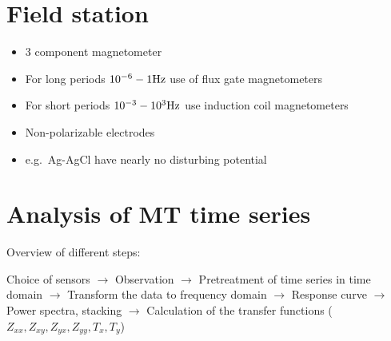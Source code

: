 \setcounter{section}{1}\addtocounter{section}{-1}\section{Field station }

\begin{itemize}
\tightlist
\item
  3 component magnetometer
\item
  For long periods \(10^{-6}-1 \mathrm{Hz}\) use of flux gate
  magnetometers
\item
  For short periods \(10^{-3}-10^3 \mathrm{Hz}\) use induction coil
  magnetometers
\item
  Non-polarizable electrodes
\item
  e.g.~Ag-AgCl have nearly no disturbing potential
\end{itemize}

\setcounter{section}{2}\addtocounter{section}{-1}\section{Analysis of MT time series }

Overview of different steps:

Choice of sensors \(\to\) Observation \(\to\) Pretreatment of time
series in time domain \(\to\) Transform the data to frequency domain
\(\to\) Response curve \(\to\) Power spectra, stacking \(\to\)
Calculation of the transfer functions
(\(Z_{xx}, Z_{xy}, Z_{yx}, Z_{yy}, T_x, T_y\))

